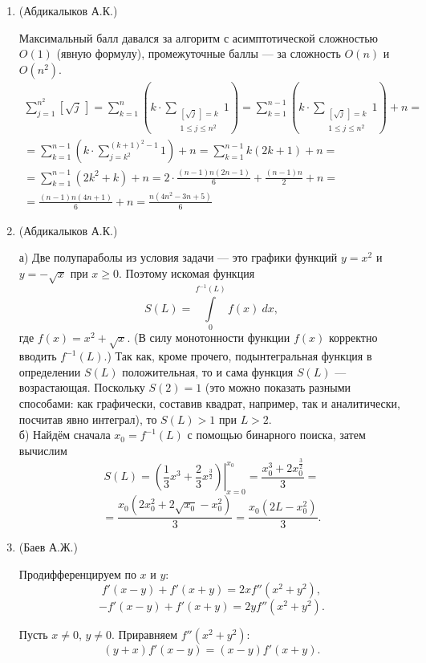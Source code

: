 \begin{enumerate}

\item (Абдикалыков А.К.)

Максимальный балл давался за алгоритм с асимптотической сложностью $O(1)$ (явную формулу), промежуточные баллы --- за сложность $O(n)$ и $O(n^2)$.
\begin{multline*}
\sum\limits_{j=1}^{n^2}{[\sqrt j\,]}=
\sum\limits_{k=1}^{n}{\left(k\cdot\sum\limits_{\substack{[\sqrt j\,]=k \\ 1 \leqslant j \leqslant n^2}}{1}\right)}=
\sum\limits_{k=1}^{n-1}{\left(k\cdot\sum\limits_{\substack{[\sqrt j\,]=k \\ 1 \leqslant j \leqslant n^2}}{1}\right)}+n=\\
=\sum\limits_{k=1}^{n-1}{\left(k\cdot\sum\limits_{j=k^2}^{(k+1)^2-1}{1}\right)}+n=
\sum\limits_{k=1}^{n-1}{k(2k+1)}+n=\\
=\sum\limits_{k=1}^{n-1}{(2k^2+k)}+n=
2\cdot\frac{(n-1)n(2n-1)}{6}+\frac{(n-1)n}{2}+n=\\
=\frac{(n-1)n(4n+1)}{6}+n=
\frac{n(4n^2-3n+5)}{6}
\end{multline*}
    
\item (Абдикалыков А.К.)

а) Две полупараболы из условия задачи --- это графики функций $y=x^2$ и $y=-\sqrt{x}$ при $x\geqslant 0$. Поэтому искомая функция
$$
S(L)=\int\limits_{0}^{f^{-1}(L)}{f(x)~dx},
$$
где $f(x)=x^2+\sqrt{x}$. (В силу монотонности функции $f(x)$ корректно вводить $f^{-1}(L)$.) Так как, кроме прочего, подынтегральная функция в определении $S(L)$ положительная, то и сама функция $S(L)$ --- возрастающая. Поскольку $S(2)=1$ (это можно показать разными способами: как графически, составив квадрат, например, так и аналитически, посчитав явно интеграл), то $S(L)>1$ при $L>2$.\\
б) Найдём сначала $x_0=f^{-1}(L)$ с помощью бинарного поиска, затем вычислим
$$
S(L)=\left.\left(\frac{1}{3}x^3+\frac{2}{3}x^{\frac{3}{2}}\right)\right|_{x=0}^{x_0}=
\frac{x_0^3+2x_0^{\frac{3}{2}}}{3}=$$
$$=\frac{x_0(2x_0^2+2\sqrt{x_0}-x_0^2)}{3}=
\frac{x_0(2L-x_0^2)}{3}.
$$

\item (Баев А.Ж.)

Продифференцируем по $x$ и $y$:
$$f'(x - y) + f'(x + y) = 2 x f''(x^2 + y^2),$$
$$ - f'(x - y) + f'(x + y) = 2 y f''(x^2 + y^2).$$

Пусть $x \ne 0$, $y \ne 0$. Приравняем $f''(x^2 + y^2)$:
$$(y + x) f'(x - y) = (x - y) f'(x + y).$$


\end{enumerate}
